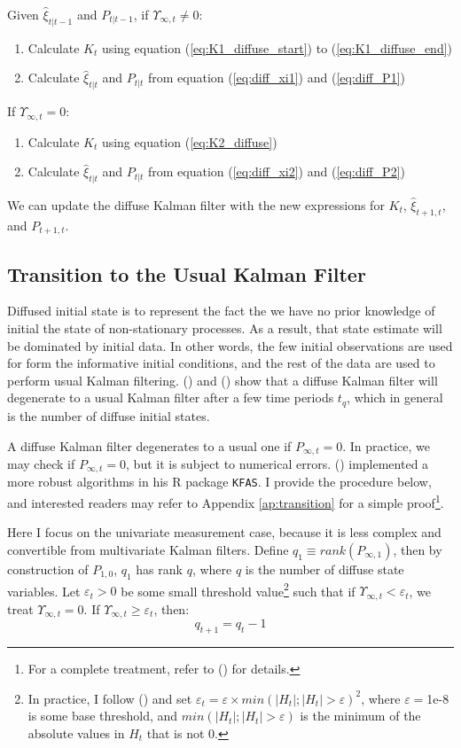 \documentclass[10pt, titlepage]{article}
\newenvironment{boenumerate}
    {\begin{enumerate}\renewcommand\labelenumi{\textbf\theenumi}}
    {\end{enumerate}}
\numberwithin{equation}{section}
\begin{document}
Given $\hat{\xi}_{t|t-1}$ and $P_{t|t-1}$, if $\Upsilon_{\infty,t}\neq 0$:
\begin{boenumerate}
    \item Calculate $K_t$ using equation (\ref{eq:K1_diffuse_start}) to (\ref{eq:K1_diffuse_end})
    \item Calculate $\hat{\xi}_{t|t}$ and $P_{t|t}$ from equation (\ref{eq:diff_xi1}) and (\ref{eq:diff_P1})
\end{boenumerate}

If $\Upsilon_{\infty,t}=0$:
\begin{boenumerate}
    \item Calculate $K_t$ using equation (\ref{eq:K2_diffuse})
    \item Calculate $\hat{\xi}_{t|t}$ and $P_{t|t}$ from equation (\ref{eq:diff_xi2}) and (\ref{eq:diff_P2})
\end{boenumerate}

We can update the diffuse Kalman filter with the new expressions for $K_t$, $\hat{\xi}_{t+1,t}$, and $P_{t+1,t}$.

\subsection{Transition to the Usual Kalman Filter}
Diffused initial state is to represent the fact the we have no prior knowledge of initial the state of non-stationary processes. As a result, that state estimate will be dominated by initial data. In other words, the few initial observations are used for form the informative initial conditions, and the rest of the data are used to perform usual Kalman filtering. (\cite{dejong_1991}) and (\cite{durbin_koopman_2003}) show that a diffuse Kalman filter will degenerate to a usual Kalman filter after a few time periods $t_q$, which in general is the number of diffuse initial states. 

A diffuse Kalman filter degenerates to a usual one if $P_{\infty,t}=0$. In practice, we may check if $P_{\infty,t}=0$, but it is subject to numerical errors. (\cite{helske_2016}) implemented a more robust algorithms in his R package \texttt{KFAS}. I provide the procedure below, and interested readers may refer to Appendix \ref{ap:transition} for a simple proof\footnote{For a complete treatment, refer to (\cite{koopman_1997}) for details.}. 

Here I focus on the univariate measurement case, because it is less complex and convertible from multivariate Kalman filters. Define $q_1\equiv rank(P_{\infty,1})$, then by construction of $P_{1,0}$, $q_1$ has rank $q$, where $q$ is the number of diffuse state variables. Let $\varepsilon_t>0$ be some small threshold value\footnote{In practice, I follow (\cite{helske_2016}) and set $\varepsilon_t=\varepsilon\times min(|H_t|;|H_t|>\varepsilon)^2$,  where $\varepsilon=$1e-8 is some base threshold, and $min(|H_t|;|H_t|>\varepsilon)$ is the minimum of the absolute values in $H_t$ that is not $0$.} such that if $\Upsilon_{\infty,t}<\varepsilon_t$, we treat $\Upsilon_{\infty,t}=0$. If $\Upsilon_{\infty,t}\geq \varepsilon_t$, then: 
\[
    q_{t+1}=q_t-1
\]
\end{document}
